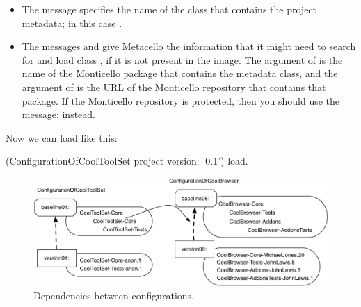 \documentclass[a4paper,10pt,twoside]{book}
\begin{document}
\begin{itemize}
\item The message  specifies the name of the class that contains the project metadata; in this case .

\item The messages  and  give Metacello the information  that it might need to search for and load class , if it is not present in the image.  The argument of  is the name of the Monticello package that contains the metadata class, and the argument of  is the URL of the Monticello repository that contains that package.
If the Monticello repository is protected, then you should use the message:  instead.

\end{itemize}



Now we can load  like this:

\begin{code}{}
(ConfigurationOfCoolToolSet project version: '0.1') load.
\end{code}



\begin{figure}
\begin{center}
\includegraphics[width=0.9\linewidth]{version07}
\caption{Dependencies between configurations.\label{fig:version07}}
\end{center}
\end{figure}
\end{document}
